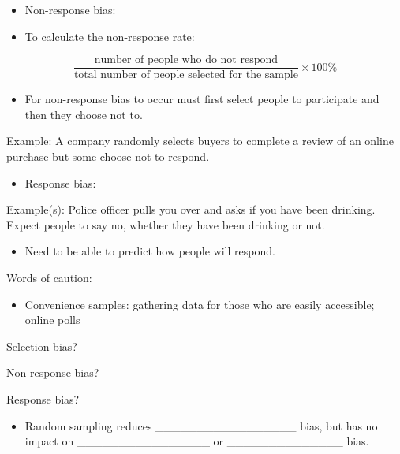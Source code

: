 \documentclass[
]{report}
\providecommand{\tightlist}{%
  \setlength{\itemsep}{0pt}\setlength{\parskip}{0pt}}
\newcommand{\rgi}{\hspace{24pt}}  %
\begin{document}
\begin{itemize}
\tightlist
\item
  Non-response bias:
\end{itemize}

\vspace{0.5in}

\begin{itemize}
\tightlist
\item
  To calculate the non-response rate:
\end{itemize}

\[\frac{\text{number of people who do not respond}}{\text{total number of people selected for the sample}}\times 100\%\]

\begin{itemize}
\tightlist
\item
  For non-response bias to occur must first select people to participate and then they choose not to.
\end{itemize}

Example: A company randomly selects buyers to complete a review of an online purchase but some choose not to respond.

\begin{itemize}
\tightlist
\item
  Response bias:
\end{itemize}

\vspace{0.5in}

Example(s): Police officer pulls you over and asks if you have been drinking. Expect people to say no, whether they have been drinking or not.

\begin{itemize}
\tightlist
\item
  Need to be able to predict how people will respond.
\end{itemize}

Words of caution:

\begin{itemize}
\tightlist
\item
  Convenience samples: gathering data for those who are easily
  accessible; online polls
\end{itemize}


\rgi \rgi Selection bias?

\rgi \rgi Non-response bias?

\rgi \rgi Response bias?

\begin{itemize}
\tightlist
\item
  Random sampling reduces \_\_\_\_\_\_\_\_\_\_\_\_\_\_\_\_\_ bias, but
  has no impact on \_\_\_\_\_\_\_\_\_\_\_\_\_\_\_\_ or \_\_\_\_\_\_\_\_\_\_\_\_\_\_ bias.
\end{itemize}
\end{document}
